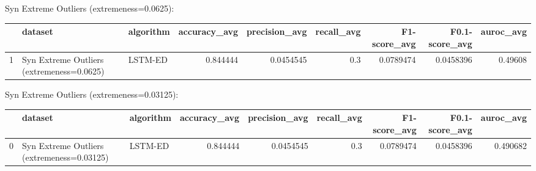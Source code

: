 Syn Extreme Outliers (extremeness=0.0625):

\begin{tabular}{rllrrrrrr}
\hline
    & dataset                                   & algorithm   &   accuracy\_avg &   precision\_avg &   recall\_avg &   F1-score\_avg &   F0.1-score\_avg &   auroc\_avg \\
\hline
  1 & Syn Extreme Outliers (extremeness=0.0625) & LSTM-ED     &       0.844444 &       0.0454545 &          0.3 &      0.0789474 &        0.0458396 &     0.49608 \\
\hline
\end{tabular}

Syn Extreme Outliers (extremeness=0.03125):

\begin{tabular}{rllrrrrrr}
\hline
    & dataset                                    & algorithm   &   accuracy\_avg &   precision\_avg &   recall\_avg &   F1-score\_avg &   F0.1-score\_avg &   auroc\_avg \\
\hline
  0 & Syn Extreme Outliers (extremeness=0.03125) & LSTM-ED     &       0.844444 &       0.0454545 &          0.3 &      0.0789474 &        0.0458396 &    0.490682 \\
\hline
\end{tabular}

